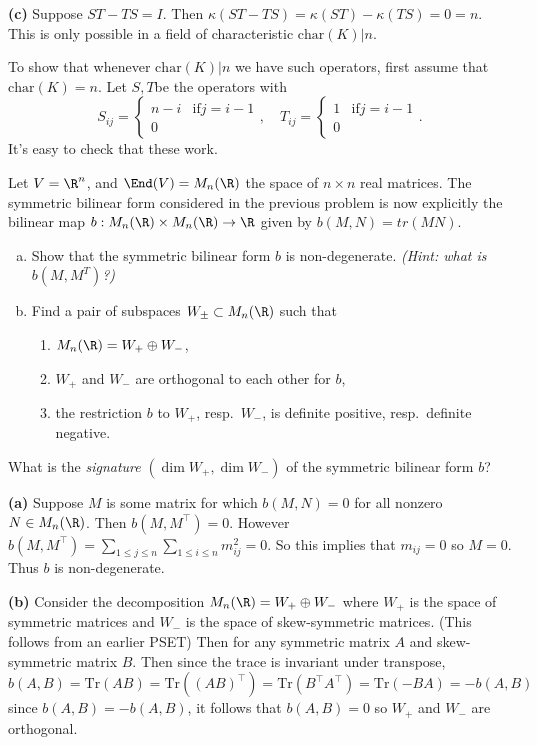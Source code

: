 \documentclass[11pt,letterpaper]{article}
\begin{document}
\textbf{(c)} Suppose $ST-TS=I$. Then $\kappa(ST-TS)=\kappa(ST)-\kappa(TS)=0=n$. This is only possible in a field of characteristic $\mathrm{char}(K)|n$. 

To show that whenever $\mathrm{char}(K)|n$ we have such operators, first assume that $\mathrm{char}(K)=n$. Let $S, T$be the operators with
\[
  S_{ij}=\begin{cases}
    n-i&\mathrm{if } j=i-1\\
    0
  \end{cases}, \quad T_{ij}=\begin{cases}
    1 &\mathrm{if } j=i-1\\
    0
  \end{cases}
.\]  
It's easy to check that these work.

\pagebreak
\begin{problem}
  Let $V=\R^n$, and $\End(V)=M_n(\R)$ the space of $n\times n$ real matrices. The symmetric bilinear form considered in the previous problem is now explicitly the bilinear map $b:M_n(\R)\times M_n(\R)\to\R$ given by $b(M,N)=tr(MN)$.
  \begin{enumerate}[(a)]
    \item Show that the symmetric bilinear form $b$ is non-degenerate.
    \textit{(Hint: what is $b(M,M^T)$?)}
    \item Find a pair of subspaces $W_\pm\subset M_n(\R)$ such that
    \begin{enumerate}[(1)]
      \item $M_n(\R)=W_+\oplus W_-$,
      \item $W_+$ and $W_-$ are orthogonal to each other for
      $b$,
      \item the restriction $b$ to $W_+$, resp.\ $W_-$, is definite 
      positive, resp.\ definite negative.
    \end{enumerate}
  \end{enumerate}
  What is the {\em signature} $(\dim W_+,\dim W_-)$ of the symmetric bilinear form $b$?
\end{problem}

\textbf{(a)} Suppose $M$ is some matrix for which $b(M, N) = 0$ for all nonzero $N\in M_n(\R)$. Then $b(M, M^\intercal) = 0$. However $b(M, M^\intercal)=\sum_{1\leq j\leq n}\sum_{1\leq i \leq n}m_{ij}^2=0$. So this implies that $m_{ij}=0$ so $M=0$. Thus $b$ is non-degenerate.       

\textbf{(b)} Consider the decomposition $M_n(\R) = W_+ \oplus W_-$ where $W_+$ is the space of symmetric matrices and $W_-$ is the space of skew-symmetric matrices. (This follows from an earlier PSET) Then for any symmetric matrix $A$ and skew-symmetric matrix $B$. Then since the trace is invariant under transpose,
\[
  b(A,B)=\mathrm{Tr}(AB)=\mathrm{Tr}((AB)^\intercal) = \mathrm{Tr}(B^\intercal A^\intercal) = \mathrm{Tr}(-BA)=-b(A,B)
\]
since $b(A,B)=-b(A,B)$, it follows that $b(A,B)=0$ so $W_+$ and $W_-$ are orthogonal.
\end{document}

